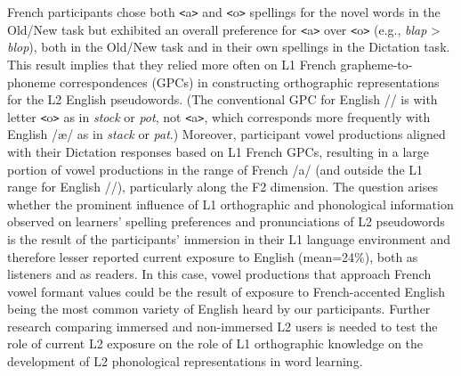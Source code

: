 \documentclass[
  english,
  man,floatsintext]{apa7}
\begin{document}
French participants chose both \texttt{\textless{}}a\texttt{\textgreater{}} and \texttt{\textless{}}o\texttt{\textgreater{}} spellings for the novel words in the Old/New task but exhibited an overall preference for \texttt{\textless{}}a\texttt{\textgreater{}} over \texttt{\textless{}}o\texttt{\textgreater{}} (e.g., \emph{blap} \textgreater{} \emph{blop}), both in the Old/New task and in their own spellings in the Dictation task. This result implies that they relied more often on L1 French grapheme-to-phoneme correspondences (GPCs) in constructing orthographic representations for the L2 English pseudowords. (The conventional GPC for English /\textscripta / is with letter \texttt{\textless{}}o\texttt{\textgreater{}} as in \emph{stock} or \emph{pot}, not \texttt{\textless{}}a\texttt{\textgreater{}}, which corresponds more frequently with English /\ae{}/ as in \emph{stack} or \emph{pat}.) Moreover, participant vowel productions aligned with their Dictation responses based on L1 French GPCs, resulting in a large portion of vowel productions in the range of French /a/ (and outside the L1 range for English /\textscripta /), particularly along the F2 dimension. The question arises whether the prominent influence of L1 orthographic and phonological information observed on learners' spelling preferences and pronunciations of L2 pseudowords is the result of the participants' immersion in their L1 language environment and therefore lesser reported current exposure to English (mean=24\%), both as listeners and as readers. In this case, vowel productions that approach French vowel formant values could be the result of exposure to French-accented English being the most common variety of English heard by our participants. Further research comparing immersed and non-immersed L2 users is needed to test the role of current L2 exposure on the role of L1 orthographic knowledge on the development of L2 phonological representations in word learning.
\end{document}
